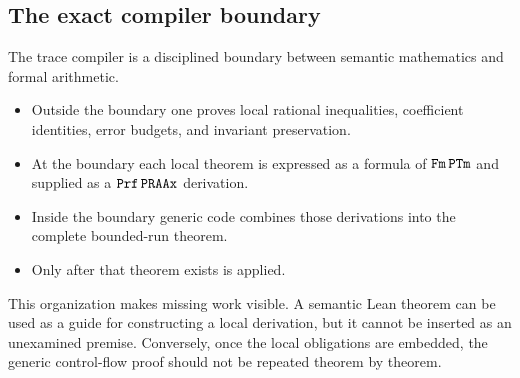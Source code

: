 \subsection{The exact compiler boundary}

The trace compiler is a disciplined boundary between semantic mathematics and
formal arithmetic.

\begin{itemize}
\item Outside the boundary one proves local rational inequalities,
      coefficient identities, error budgets, and invariant preservation.
\item At the boundary each local theorem is expressed as a formula of
      \(\texttt{Fm}\,\texttt{PTm}\) and supplied as a \(\texttt{Prf}\,\texttt{PRAAx}\) derivation.
\item Inside the boundary generic code combines those derivations into the
      complete bounded-run theorem.
\item Only after that theorem exists is  applied.
\end{itemize}

This organization makes missing work visible.  A semantic Lean theorem can be
used as a guide for constructing a local derivation, but it cannot be inserted
as an unexamined premise.  Conversely, once the local obligations are embedded,
the generic control-flow proof should not be repeated theorem by theorem.
